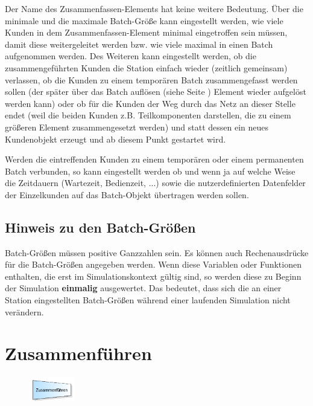 Der Name des Zusammenfassen-Elements hat keine weitere Bedeutung. Über die minimale und die maximale Batch-Größe kann
eingestellt werden, wie viele Kunden in dem Zusammenfassen-Element minimal eingetroffen sein müssen, damit diese 
weitergeleitet werden bzw. wie viele maximal in einen Batch aufgenommen werden. Des Weiteren kann eingestellt werden,
ob die zusammengeführten Kunden die Station einfach wieder (zeitlich gemeinsam) verlassen, ob die Kunden zu einem temporären
Batch zusammengefasst werden sollen (der später über das Batch auflösen (siehe Seite \pageref{ref:ModelElementSeparate}) Element
wieder aufgelöst werden kann) oder ob für die Kunden der Weg durch
das Netz an dieser Stelle endet (weil die beiden Kunden z.B. Teilkomponenten darstellen, die zu einem größeren Element
zusammengesetzt werden) und statt dessen ein neues Kundenobjekt erzeugt und ab diesem Punkt gestartet wird.

Werden die eintreffenden Kunden zu einem temporären oder einem permanenten Batch verbunden, so kann eingestellt werden
ob und wenn ja auf welche Weise die Zeitdauern (Wartezeit, Bedienzeit, ...) sowie die nutzerdefinierten Datenfelder
der Einzelkunden auf das Batch-Objekt übertragen werden sollen.

\subsection*{Hinweis zu den Batch-Größen}

Batch-Größen müssen positive Ganzzahlen sein.
Es können auch Rechenausdrücke für die Batch-Größen angegeben werden.
Wenn diese Variablen oder Funktionen enthalten, die erst im Simulationskontext gültig sind, so werden diese zu Beginn der Simulation \textbf{einmalig} ausgewertet.
Das bedeutet, dass sich die an einer Station eingestellten Batch-Größen während einer laufenden Simulation nicht verändern.


\section{Zusammenführen}
\label{ref:ModelElementMatch}

\begin{figure}
\vspace{-22pt}
\includegraphics[width=2cm]{imageModelElementMatch.png}
\vspace{-22pt}
\end{figure}

